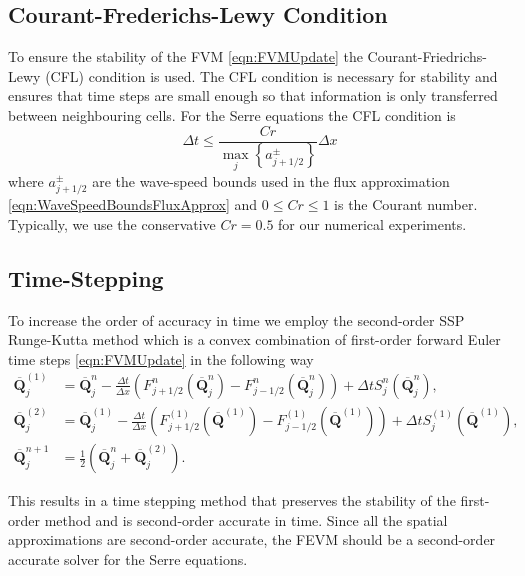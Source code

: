 \documentclass[AMA,STIX1COL]{WileyNJD-v2}
\newcommand{\vecn}[1]{\boldsymbol{#1}}
\begin{document}
\subsection{Courant-Frederichs-Lewy Condition}
To ensure the stability of the FVM \eqref{eqn:FVMUpdate} the Courant-Friedrichs-Lewy (CFL) condition \cite{Courant-etal-1967-215} is used. The CFL condition is necessary for stability and ensures that time steps are small enough so that information is only transferred between neighbouring cells. For the Serre equations the CFL condition is 
\begin{equation}
\Delta t \le \frac{Cr }{\max_{j} \left\lbrace a^\pm_{j+1/2} \right\rbrace} \Delta x
\label{eqn:CFLcond}
\end{equation}
where $a^\pm_{j+1/2} $ are the wave-speed bounds used in the flux approximation \eqref{eqn:WaveSpeedBoundsFluxApprox} and $0\le Cr \le 1$ is the Courant number. Typically, we use the conservative $Cr = 0.5$ for our numerical experiments.

\subsection{Time-Stepping}
To increase the order of accuracy in time we employ the second-order SSP Runge-Kutta method \cite{Gottlieb-etal-2003-89} which is a convex combination of first-order forward Euler time steps \eqref{eqn:FVMUpdate} in the following way
\begin{subequations}
	\begin{align}
\overline{\vecn{Q} }^{(1)}_j &= \overline{\vecn{Q} }^{n}_j - \frac{\Delta t}{\Delta x} \left(F^n_{j+1/2}\left(\overline{\vecn{Q} }^{n}_j \right) - F^n_{j-1/2}\left(\overline{\vecn{Q} }^{n}_j \right) \right) + \Delta t S^n_j\left(\overline{\vecn{Q} }^{n}_j\right),\\
\overline{\vecn{Q} }^{(2)}_j &= \overline{\vecn{Q} }^{(1)}_j - \frac{\Delta t}{\Delta x} \left(F^{(1)}_{j+1/2}\left(\overline{\vecn{Q} }^{(1)} \right) - F^{(1)}_{j-1/2}\left(\overline{\vecn{Q} }^{(1)} \right) \right) + \Delta t S^{(1)}_j\left(\overline{\vecn{Q} }^{(1)} \right),\\
	\overline{\vecn{Q} }^{n+1}_j &= \frac{1}{2} \left( \overline{\vecn{Q} }^n_j +  \overline{\vecn{Q} }_j^{(2)}  \right).
	\end{align}
	\label{eqn:SSPRKStep1}
\end{subequations}

This results in a time stepping method that preserves the stability of the first-order method and is second-order accurate in time. Since all the spatial approximations are second-order accurate, the FEVM should be a second-order accurate solver for the Serre equations. 
\end{document}
